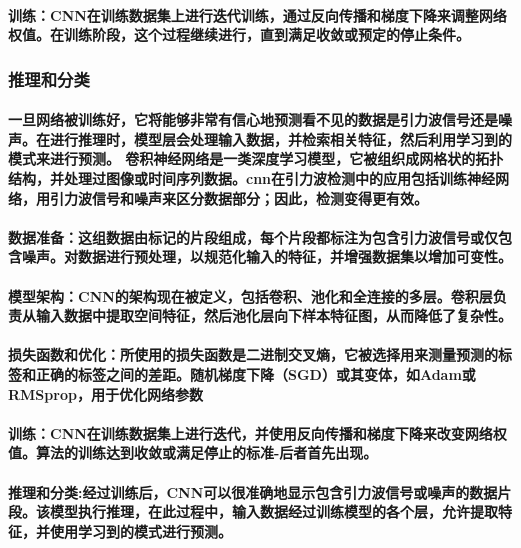 \documentclass{article}
\begin{document}
\paragraph{训练：CNN在训练数据集上进行迭代训练，通过反向传播和梯度下降来调整网络权值。在训练阶段，这个过程继续进行，直到满足收敛或预定的停止条件。}
\subsubsection{推理和分类}
\paragraph{一旦网络被训练好，它将能够非常有信心地预测看不见的数据是引力波信号还是噪声。在进行推理时，模型层会处理输入数据，并检索相关特征，然后利用学习到的模式来进行预测。
卷积神经网络是一类深度学习模型，它被组织成网格状的拓扑结构，并处理过图像或时间序列数据。cnn在引力波检测中的应用包括训练神经网络，用引力波信号和噪声来区分数据部分；因此，检测变得更有效。}
\paragraph{数据准备：这组数据由标记的片段组成，每个片段都标注为包含引力波信号或仅包含噪声。对数据进行预处理，以规范化输入的特征，并增强数据集以增加可变性。}
\paragraph{模型架构：CNN的架构现在被定义，包括卷积、池化和全连接的多层。卷积层负责从输入数据中提取空间特征，然后池化层向下样本特征图，从而降低了复杂性。}
\paragraph{损失函数和优化：所使用的损失函数是二进制交叉熵，它被选择用来测量预测的标签和正确的标签之间的差距。随机梯度下降（SGD）或其变体，如Adam或RMSprop，用于优化网络参数}
\paragraph{训练：CNN在训练数据集上进行迭代，并使用反向传播和梯度下降来改变网络权值。算法的训练达到收敛或满足停止的标准-后者首先出现。}
\paragraph{推理和分类:经过训练后，CNN可以很准确地显示包含引力波信号或噪声的数据片段。该模型执行推理，在此过程中，输入数据经过训练模型的各个层，允许提取特征，并使用学习到的模式进行预测。}
\end{document}
